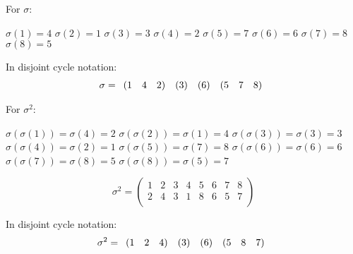 \documentclass[a4paper]{article}
\begin{document}
\begin{myparindent}{0pt}
For $\sigma$:

$\sigma(1) = 4$ \newline
$\sigma(2) = 1$ \newline
$\sigma(3) = 3$ \newline
$\sigma(4) = 2$ \newline
$\sigma(5) = 7$ \newline
$\sigma(6) = 6$ \newline
$\sigma(7) = 8$ \newline
$\sigma(8) = 5$ \newline

In disjoint cycle notation:
\[
    \noindent \sigma = \begin{array}{rrr} (1 & 4 & 2) \end{array}
    \noindent \begin{array}{r} (3) \end{array}
    \noindent \begin{array}{r} (6) \end{array}
    \noindent \begin{array}{rrr} (5 & 7 & 8) \end{array}
\]

For $\sigma^2$:

$\sigma(\sigma(1)) = \sigma(4) = 2$ \newline
$\sigma(\sigma(2)) = \sigma(1) = 4$ \newline
$\sigma(\sigma(3)) = \sigma(3) = 3$ \newline
$\sigma(\sigma(4)) = \sigma(2) = 1$ \newline
$\sigma(\sigma(5)) = \sigma(7) = 8$ \newline
$\sigma(\sigma(6)) = \sigma(6) = 6$ \newline
$\sigma(\sigma(7)) = \sigma(8) = 5$ \newline
$\sigma(\sigma(8)) = \sigma(5) = 7$ \newline

\[
  \sigma^2 =
  \begin{pmatrix}
    1 & 2 & 3 & 4 & 5 & 6 & 7 & 8 \\
    2 & 4 & 3 & 1 & 8 & 6 & 5 & 7 \\
  \end{pmatrix}
\]

In disjoint cycle notation:
\[
    \noindent \sigma^2 = \begin{array}{rrr} (1 & 2 & 4) \end{array}
    \noindent \begin{array}{r} (3) \end{array}
    \noindent \begin{array}{r} (6) \end{array}
    \noindent \begin{array}{rrr} (5 & 8 & 7) \end{array}
\]


\end{myparindent}
\end{document}
